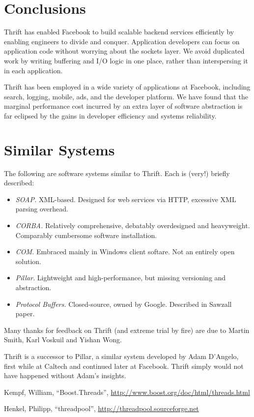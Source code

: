 \documentclass[nocopyrightspace,blockstyle]{sigplanconf}
\begin{document}
\section{Conclusions}
Thrift has enabled Facebook to build scalable backend
services efficiently by enabling engineers to divide and conquer. Application
developers can focus on application code without worrying about the
sockets layer. We avoid duplicated work by writing buffering and I/O logic
in one place, rather than interspersing it in each application.

Thrift has been employed in a wide variety of applications at Facebook,
including search, logging, mobile, ads, and the developer platform. We have
found that the marginal performance cost incurred by an extra layer of
software abstraction is far eclipsed by the gains in developer efficiency and
systems reliability.

\appendix

\section{Similar Systems}
The following are software systems similar to Thrift. Each is (very!) briefly
described:

\begin{itemize}
\item \textit{SOAP.} XML-based. Designed for web services via HTTP, excessive
XML parsing overhead.
\item \textit{CORBA.} Relatively comprehensive, debatably overdesigned and
heavyweight. Comparably cumbersome software installation.
\item \textit{COM.} Embraced mainly in Windows client softare. Not an entirely
open solution.
\item \textit{Pillar.} Lightweight and high-performance, but missing versioning
and abstraction.
\item \textit{Protocol Buffers.} Closed-source, owned by Google. Described in
Sawzall paper.
\end{itemize}

\acks

Many thanks for feedback on Thrift (and extreme trial by fire) are due to
Martin Smith, Karl Voskuil and Yishan Wong.

Thrift is a successor to Pillar, a similar system developed
by Adam D'Angelo, first while at Caltech and continued later at Facebook.
Thrift simply would not have happened without Adam's insights.

\begin{thebibliography}{}

Kempf, William,
``Boost.Threads'',
\url{http://www.boost.org/doc/html/threads.html}

Henkel, Philipp,
``threadpool'',
\url{http://threadpool.sourceforge.net}

\end{thebibliography}
\end{document}
